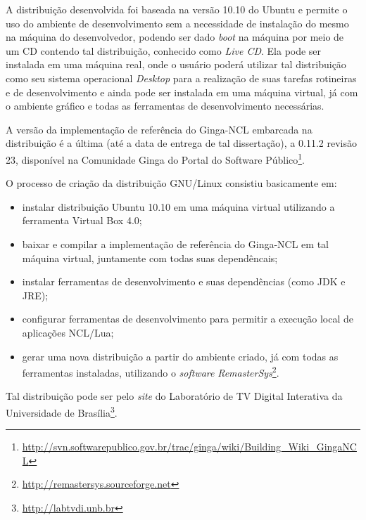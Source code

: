 A distribuição desenvolvida foi baseada na versão 10.10 do Ubuntu e permite
o uso do ambiente de desenvolvimento sem a necessidade de instalação do mesmo
na máquina do desenvolvedor, podendo ser dado \textit{boot} na máquina por meio
de um CD contendo tal distribuição, conhecido como \textit{Live CD}. Ela pode
ser instalada em uma máquina real, onde o usuário poderá utilizar tal
distribuição como seu sistema operacional \textit{Desktop} para
a realização de suas tarefas rotineiras e de desenvolvimento e ainda
pode ser instalada em uma máquina virtual, já com o ambiente gráfico e todas
as ferramentas de desenvolvimento necessárias.

A versão da implementação de referência do Ginga-NCL embarcada na distribuição
é a última (até a data de entrega de tal dissertação), a 0.11.2 revisão 23, disponível
na Comunidade Ginga do Portal do Software Público\footnote{\url{http://svn.softwarepublico.gov.br/trac/ginga/wiki/Building\_Wiki\_GingaNCL}}.

O processo de criação da distribuição GNU/Linux consistiu basicamente em:
\begin{itemize}
	\item instalar distribuição Ubuntu 10.10 em uma máquina virtual utilizando a ferramenta Virtual Box 4.0;
	\item baixar e compilar a implementação de referência do Ginga-NCL em tal máquina virtual, juntamente
	com todas suas dependêncais;
	\item instalar ferramentas de desenvolvimento e suas dependências (como JDK e JRE);
	\item configurar ferramentas de desenvolvimento para permitir a execução local de aplicações NCL/Lua;
	\item gerar uma nova distribuição a partir do ambiente criado, já com todas as ferramentas instaladas,
	utilizando o \textit{software} \textit{RemasterSys}\footnote{\url{http://remastersys.sourceforge.net}}.
\end{itemize}

Tal distribuição pode ser  pelo \textit{site} do Laboratório de TV Digital Interativa da Universidade de Brasília\footnote{\url{http://labtvdi.unb.br}}.
